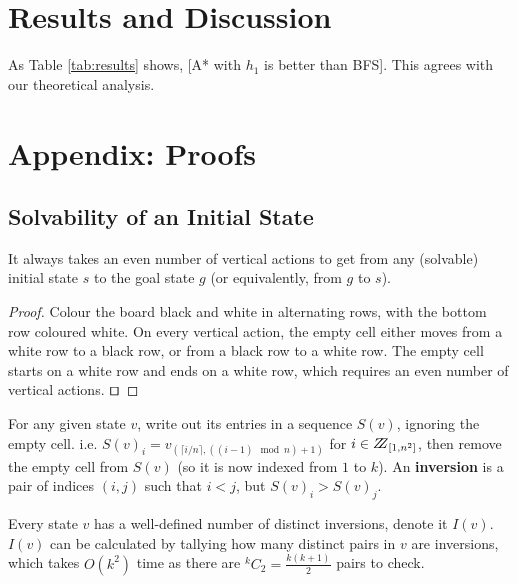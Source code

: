 \documentclass[runningheads]{llncs}
\begin{document}
\section{Results and Discussion}
As Table \ref{tab:results} shows, [A* with $h_1$ is better than BFS].
This agrees with our theoretical analysis.



\pagebreak
\appendix
\section{Appendix: Proofs}
\label{app:proofs}

\subsection{Solvability of an Initial State \cite{Solvability}}
\label{subsec:solvability}
\begin{lemma}\label{lem:evennumofvertactions}
It always takes an even number of vertical actions to get from any (solvable) initial state $s$ to the goal state $g$ (or equivalently, from $g$ to $s$).
\end{lemma}
\begin{proof}
Colour the board black and white in alternating rows, with the bottom row coloured white. On every vertical action, the empty cell either moves from a white row to a black row, or from a black row to a white row. The empty cell starts on a white row and ends on a white row, which requires an even number of vertical actions. $\qed$
\end{proof}

\begin{definition}\label{def:inversion}
For any given state $v$, write out its entries in a sequence $S(v)$, ignoring the empty cell. i.e. $S(v)_i = v_{(\lceil i/n\rceil, ((i-1) \mod n) +1)}$ for $i \in \bbbz_{[1,n^2]}$, then remove the empty cell from $S(v)$ (so it is now indexed from $1$ to $k$). An \textbf{inversion} is a pair of indices $(i,j)$ such that $i < j$, but $S(v)_i > S(v)_j$.
\end{definition}
Every state $v$ has a well-defined number of distinct inversions, denote it $I(v)$. $I(v)$ can be calculated by tallying how many distinct pairs in $v$ are inversions, which takes $O(k^2)$ time as there are $^kC_2 = \frac{k(k+1)}{2}$ pairs to check.
\end{document}
